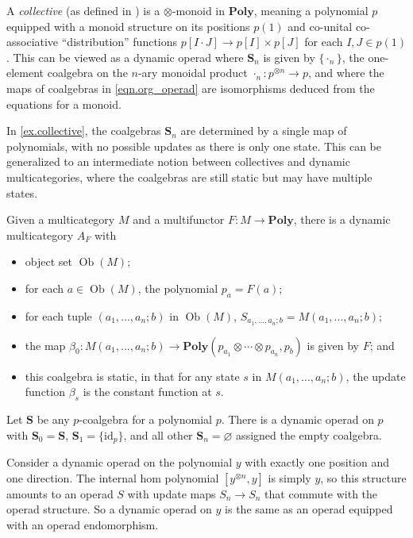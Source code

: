 \documentclass[11pt, one side, article]{memoir}
\theoremstyle{definition}
\theoremstyle{plain}
\newenvironment{example}
  {\pushQED{\qed}\renewcommand{\qedsymbol}{$\lozenge$}\examplex}
  {\popQED\endexamplex}
\DeclareMathOperator{\ob}{Ob}
\newcommand{\Cat}[1]{\mathbf{#1}}%
\newcommand{\id}{\mathrm{id}}
\newcommand{\poly}{\Cat{Poly}}
\newcommand{\0}{\textsf{0}}
\newcommand{\1}{\tn{\textsf{1}}}
\renewcommand{\S}{{\Cat{S}}}
\newcommand{\idcoalg}[1]{{\{\id_{#1}\}}}
\begin{document}
\begin{example}\label{ex.collective}
A \emph{collective} (as defined in \cite{niu2021collectives}) is a $\otimes$-monoid in $\poly$, meaning a polynomial $p$ equipped with a monoid structure on its positions $p(1)$ and co-unital co-associative ``distribution'' functions $p[I \cdot J] \to p[I] \times p[J]$ for each $I,J \in p(1)$. This can be viewed as a dynamic operad where $\S_n$ is given by $\{\cdot_n\}$, the one-element coalgebra on the $n$-ary monoidal product $\cdot_n\colon p^{\otimes n} \to p$, and where the maps of coalgebras in \eqref{eqn.org_operad} are isomorphisms deduced from the equations for a monoid.
\end{example}

\begin{example}
In \cref{ex.collective}, the coalgebras $\S_n$ are determined by a single map of polynomials, with no possible updates as there is only one state. This can be generalized to an intermediate notion between collectives and dynamic multicategories, where the coalgebras are still static but may have multiple states.

Given a multicategory $M$ and a multifunctor $F\colon M \to \poly$, there is a dynamic multicategory $A_F$ with 
\begin{itemize}
	\item object set $\ob(M)$;
	\item for each $a \in \ob(M)$, the polynomial $p_a = F(a)$;
	\item for each tuple $(a_1,...,a_n;b)$ in $\ob(M)$, $S_{a_1,...,a_n;b} = M(a_1,...,a_n;b)$;
	\item the map $\beta_0\colon M(a_1,...,a_n;b) \to \poly(p_{a_1} \otimes \cdots \otimes p_{a_n},p_b)$ is given by $F$; and 
	\item this coalgebra is static, in that for any state $s$ in $M(a_1,...,a_n;b)$, the update function $\beta_s$ is the constant function at $s$.
	\qedhere
\end{itemize}
\end{example}

\begin{example}
Let $\S$ be any $p$-coalgebra for a polynomial $p$. There is a dynamic operad on $p$ with $\S_0 = \S$, $\S_1 = \idcoalg{p}$, and all other $\S_n=\varnothing$ assigned the empty coalgebra.
\end{example}

\begin{example}
Consider a dynamic operad on the polynomial $y$ with exactly one position and one direction. The internal hom polynomial $[y^{\otimes n},y]$ is simply $y$, so this structure amounts to an operad $S$ with update maps $S_n \to S_n$ that commute with the operad structure. So a dynamic operad on $y$ is the same as an operad equipped with an operad endomorphism.
\end{example}
\end{document}
